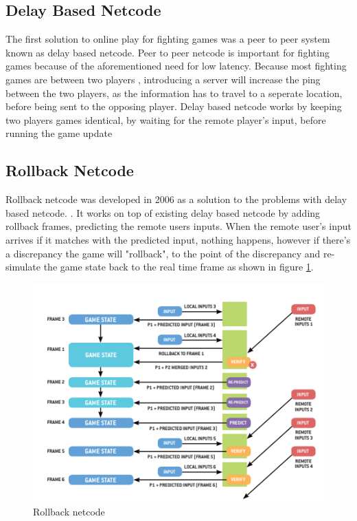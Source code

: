 \documentclass{entcs}
\begin{document}
\subsection{Delay Based Netcode}
The first solution to online play for fighting games was a peer to peer system known as delay based netcode. Peer to peer netcode is important for fighting games because of the aforementioned need for low latency. Because most fighting games are between two players \cite{FightingGameDefine}, introducing a server will increase the ping between the two players, as the information has to travel to a seperate location, before being sent to the opposing player. Delay based netcode works by keeping two players games identical, by waiting for the remote player's input, before running the game update

\subsection{Rollback Netcode}
Rollback netcode was developed in 2006 as a solution to the problems with delay based netcode. \cite{RollbackDevelopment}. It works on top of existing delay based netcode by adding rollback frames, predicting the remote users inputs. When the remote user's input arrives if it matches with the predicted input, nothing happens, however if there's a discrepancy the game will "rollback", to the point of the discrepancy and re-simulate the game state back to the real time frame as shown in figure \ref{fig:RollbackNetcodeRepresentation}.

\begin{figure}[h]
\centering
\includegraphics{RollbackNetcodeRepresentation}
\caption{Rollback netcode \cite{GGPODocumentation}}
\label{fig:RollbackNetcodeRepresentation}
\end{figure}
\newpage
\end{document}
